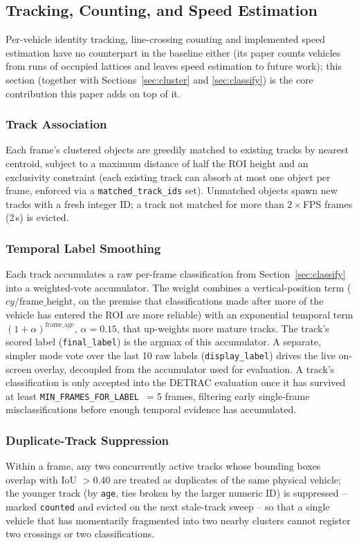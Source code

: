 \documentclass[conference]{IEEEtran}
\newcommand{\code}[1]{\texttt{#1}}
\begin{document}
\subsection{Tracking, Counting, and Speed Estimation}
\label{sec:tracking}

Per-vehicle identity tracking, line-crossing counting and implemented
speed estimation have no counterpart in the baseline \cite{baseline}
either (its paper counts vehicles from runs of occupied lattices and
leaves speed estimation to future work); this section (together with
Sections~\ref{sec:cluster} and \ref{sec:classify}) is the core
contribution this paper adds on top of it.

\subsubsection{Track Association}
Each frame's clustered objects are greedily matched to existing tracks
by nearest centroid, subject to a maximum distance of half the ROI
height and an exclusivity constraint (each existing track can absorb at
most one object per frame, enforced via a \code{matched\_track\_ids}
set). Unmatched objects spawn new tracks with a fresh integer ID; a track
not matched for more than $2\times$FPS frames (2\,s) is evicted.

\subsubsection{Temporal Label Smoothing}
Each track accumulates a raw per-frame classification from
Section~\ref{sec:classify} into a weighted-vote accumulator. The weight
combines a vertical-position term ($cy / \text{frame\_height}$, on the
premise that classifications made after more of the vehicle has entered
the ROI are more reliable) with an exponential temporal term
$(1+\alpha)^{\text{frame\_age}}$, $\alpha=0.15$, that up-weights more
mature tracks. The track's scored label (\code{final\_label}) is the
argmax of this accumulator. A separate, simpler mode vote over the last
10 raw labels (\code{display\_label}) drives the live on-screen overlay,
decoupled from the accumulator used for evaluation. A track's
classification is only accepted into the DETRAC evaluation once it has
survived at least \code{MIN\_FRAMES\_FOR\_LABEL}~$=5$ frames, filtering
early single-frame misclassifications before enough temporal evidence
has accumulated.

\subsubsection{Duplicate-Track Suppression}
\label{sec:dupsupp}
Within a frame, any two concurrently active tracks whose bounding boxes
overlap with IoU $>0.40$ are treated as duplicates of the same physical
vehicle; the younger track (by \code{age}, ties broken by the larger
numeric ID) is suppressed -- marked \code{counted} and evicted on the
next stale-track sweep -- so that a single vehicle that has momentarily
fragmented into two nearby clusters cannot register two crossings or
two classifications.
\end{document}
